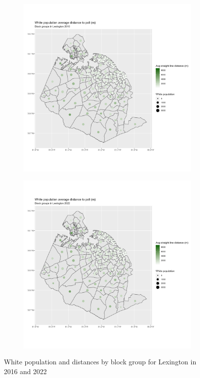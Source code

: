 \documentclass[11pt]{article}
\theoremstyle{remark}
\theoremstyle{definition}
\begin{document}
\begin{figure}
	\begin{subfigure}{.5\textwidth}
		\centering
		\includegraphics[width=\linewidth]{result_analysis/Lexington_County_SC_original_configs/white_pop_and_dist_Lexington_config_original_2016_polls.png}
		\label{sfig:York_2016_bg_dist_pop}
	\end{subfigure} 
	\begin{subfigure}{.5\textwidth}
		\centering
		\includegraphics[width=\linewidth]{result_analysis/Lexington_County_SC_original_configs/white_pop_and_dist_Lexington_config_original_2022_polls.png}
		\label{sfig:Lexington_2022_bg_dist}
	\end{subfigure}
	\caption{White population and distances by block group for Lexington in 2016 and 2022}
	\label{fig:Lexington distance White population maps}
\end{figure}
\end{document}
